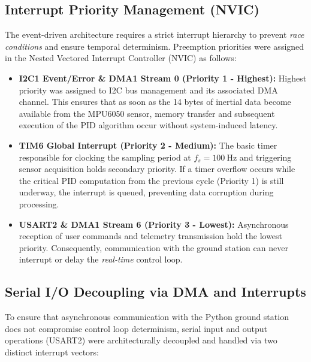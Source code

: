 \documentclass[11pt, a4paper]{article}
\begin{document}
\subsection{Interrupt Priority Management (NVIC)}
The event-driven architecture requires a strict interrupt hierarchy to prevent \textit{race conditions} and ensure temporal determinism. Preemption priorities were assigned in the Nested Vectored Interrupt Controller (NVIC) as follows:

\begin{itemize}
    \item \textbf{I2C1 Event/Error \& DMA1 Stream 0 (Priority 1 - Highest):} Highest priority was assigned to I2C bus management and its associated DMA channel. This ensures that as soon as the 14 bytes of inertial data become available from the MPU6050 sensor, memory transfer and subsequent execution of the PID algorithm occur without system-induced latency.
    \item \textbf{TIM6 Global Interrupt (Priority 2 - Medium):} The basic timer responsible for clocking the sampling period at $f_s = \SI{100}{\hertz}$ and triggering sensor acquisition holds secondary priority. If a timer overflow occurs while the critical PID computation from the previous cycle (Priority 1) is still underway, the interrupt is queued, preventing data corruption during processing.
    \item \textbf{USART2 \& DMA1 Stream 6 (Priority 3 - Lowest):} Asynchronous reception of user commands and telemetry transmission hold the lowest priority. Consequently, communication with the ground station can never interrupt or delay the \textit{real-time} control loop.
\end{itemize}

\subsection{Serial I/O Decoupling via DMA and Interrupts}
To ensure that asynchronous communication with the Python ground station does not compromise control loop determinism, serial input and output operations (USART2) were architecturally decoupled and handled via two distinct interrupt vectors:
\end{document}
